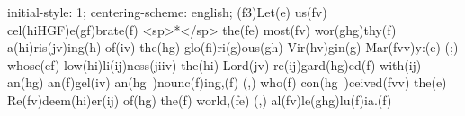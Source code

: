 initial-style: 1;
centering-scheme: english;
(f3)Let(e) us(fv) cel(hiHGF)e(gf)brate(f) <sp>*</sp> the(fe) most(fv) wor(ghg)thy(f) a(hi)ris(jv)ing(h) of(iv) the(hg) glo(fi)ri(g)ous(gh) Vir(hv)gin(g) Mar(fvv)y:(e) (;) whose(ef) low(hi)li(ij)ness(jiiv) the(hi) Lord(jv) re(ij)gard(hg)ed(f) with(ij) an(hg) an(f)gel(iv) an(hg~)nounc(f)ing,(f) (,) who(f) con(hg~)ceived(fvv) the(e) Re(fv)deem(hi)er(ij) of(hg) the(f) world,(fe) (,) al(fv)le(ghg)lu(f)ia.(f)
